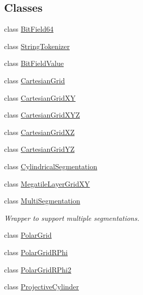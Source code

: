 \subsection*{Classes}
\begin{DoxyCompactItemize}
\item 
class \hyperlink{class_d_d4hep_1_1_d_d_segmentation_1_1_bit_field64}{BitField64}
\item 
class \hyperlink{class_d_d4hep_1_1_d_d_segmentation_1_1_string_tokenizer}{StringTokenizer}
\item 
class \hyperlink{class_d_d4hep_1_1_d_d_segmentation_1_1_bit_field_value}{BitFieldValue}
\item 
class \hyperlink{class_d_d4hep_1_1_d_d_segmentation_1_1_cartesian_grid}{CartesianGrid}
\item 
class \hyperlink{class_d_d4hep_1_1_d_d_segmentation_1_1_cartesian_grid_x_y}{CartesianGridXY}
\item 
class \hyperlink{class_d_d4hep_1_1_d_d_segmentation_1_1_cartesian_grid_x_y_z}{CartesianGridXYZ}
\item 
class \hyperlink{class_d_d4hep_1_1_d_d_segmentation_1_1_cartesian_grid_x_z}{CartesianGridXZ}
\item 
class \hyperlink{class_d_d4hep_1_1_d_d_segmentation_1_1_cartesian_grid_y_z}{CartesianGridYZ}
\item 
class \hyperlink{class_d_d4hep_1_1_d_d_segmentation_1_1_cylindrical_segmentation}{CylindricalSegmentation}
\item 
class \hyperlink{class_d_d4hep_1_1_d_d_segmentation_1_1_megatile_layer_grid_x_y}{MegatileLayerGridXY}
\item 
class \hyperlink{class_d_d4hep_1_1_d_d_segmentation_1_1_multi_segmentation}{MultiSegmentation}
\begin{DoxyCompactList}\small\item\em Wrapper to support multiple segmentations. \item\end{DoxyCompactList}\item 
class \hyperlink{class_d_d4hep_1_1_d_d_segmentation_1_1_polar_grid}{PolarGrid}
\item 
class \hyperlink{class_d_d4hep_1_1_d_d_segmentation_1_1_polar_grid_r_phi}{PolarGridRPhi}
\item 
class \hyperlink{class_d_d4hep_1_1_d_d_segmentation_1_1_polar_grid_r_phi2}{PolarGridRPhi2}
\item 
class \hyperlink{class_d_d4hep_1_1_d_d_segmentation_1_1_projective_cylinder}{ProjectiveCylinder}

\end{DoxyCompactItemize}
